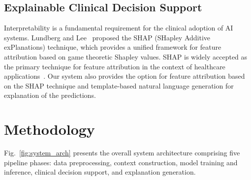 \documentclass[runningheads]{llncs}
\begin{document}
\subsection{Explainable Clinical Decision Support}

Interpretability is a fundamental requirement for the clinical adoption of AI systems. Lundberg and Lee~\cite{Lundberg2017} proposed the SHAP (SHapley Additive exPlanations) technique, which provides a unified framework for feature attribution based on game theoretic Shapley values. SHAP is widely accepted as the primary technique for feature attribution in the context of healthcare applications~\cite{Lauritsen2020}. Our system also provides the option for feature attribution based on the SHAP technique and template-based natural language generation for explanation of the predictions.

\section{Methodology}

Fig.~\ref{fig:system_arch} presents the overall system architecture comprising five pipeline phases: data preprocessing, context construction, model training and inference, clinical decision support, and explanation generation.
\end{document}
